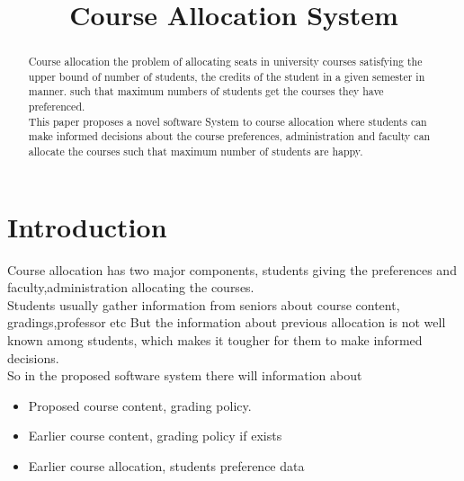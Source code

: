 \documentclass[conference]{IEEEtran}
\begin{document}
\title{Course Allocation System}


\author{
}

\maketitle

\begin{abstract}
Course allocation the problem of allocating seats in university courses 
satisfying the upper bound of number of students, 
the credits of the student in a given semester in manner.
such that maximum numbers of students get the courses they have preferenced.\\
This paper proposes a novel software System to course allocation 
where students can make informed decisions about the course preferences,
administration and faculty can allocate the courses such that maximum number of students are happy.\\
\end{abstract}

\section{ \textbf{Introduction}} 
Course allocation has two major components, students giving the preferences and faculty,administration allocating the courses.\\
Students usually gather information from seniors about course content, gradings,professor etc
But the information about previous allocation is not well known among students, 
which makes it tougher for them to make informed decisions.\\
So in the proposed software system there will information about 
\begin{itemize}
\item Proposed course content, grading policy.   
\item Earlier course content, grading policy if exists
\item Earlier course allocation, students preference data
\end{itemize}
\end{document}
